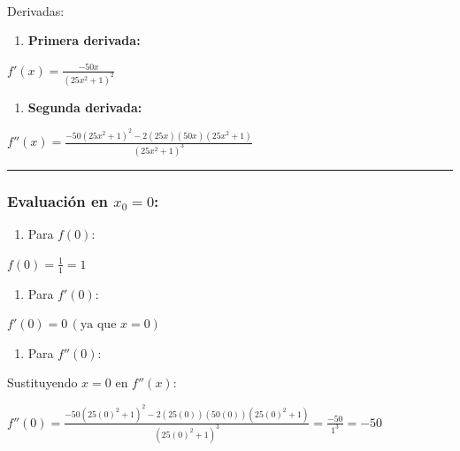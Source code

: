 \documentclass[
  letterpaper,
  DIV=11,
  numbers=noendperiod]{scrartcl}
\makeatletter
\let\oldparagraph\paragraph
\renewcommand{\paragraph}{
    \@ifstar
      \xxxParagraphStar
      \xxxParagraphNoStar
  }
\newcommand{\xxxParagraphStar}[1]{\oldparagraph*{#1}\mbox{}}
\newcommand{\xxxParagraphNoStar}[1]{\oldparagraph{#1}\mbox{}}
\providecommand{\tightlist}{%
  \setlength{\itemsep}{0pt}\setlength{\parskip}{0pt}}\usepackage{longtable,booktabs,array}
\makeatother
\begin{document}
\paragraph{Derivadas:}\label{derivadas}

\begin{enumerate}
\def\labelenumi{\arabic{enumi}.}
\tightlist
\item
  \textbf{Primera derivada:}
\end{enumerate}

\(f'(x) = \frac{-50x}{(25x^2 + 1)^2}\)

\begin{enumerate}
\def\labelenumi{\arabic{enumi}.}
\setcounter{enumi}{1}
\tightlist
\item
  \textbf{Segunda derivada:}
\end{enumerate}

\(f''(x) = \frac{-50(25x^2 + 1)^2 - 2(25x)(50x)(25x^2 + 1)}{(25x^2 + 1)^3}\)

\begin{center}\rule{0.5\linewidth}{0.5pt}\end{center}

\subsubsection{\texorpdfstring{Evaluación en
\(x_0 = 0\):}{Evaluación en x\_0 = 0:}}\label{evaluaciuxf3n-en-x_0-0}

\begin{enumerate}
\def\labelenumi{\arabic{enumi}.}
\tightlist
\item
  Para \(f(0)\):
\end{enumerate}

\(f(0) = \frac{1}{1} = 1\)

\begin{enumerate}
\def\labelenumi{\arabic{enumi}.}
\setcounter{enumi}{1}
\tightlist
\item
  Para \(f'(0)\):
\end{enumerate}

\(f'(0) = 0 \, (\text{ya que } x = 0)\)

\begin{enumerate}
\def\labelenumi{\arabic{enumi}.}
\setcounter{enumi}{2}
\tightlist
\item
  Para \(f''(0)\):
\end{enumerate}

Sustituyendo \(x = 0\) en \(f''(x)\):

\(f''(0) = \frac{-50(25(0)^2 + 1)^2 - 2(25(0))(50(0))(25(0)^2 + 1)}{(25(0)^2 + 1)^3} = \frac{-50}{1^3} = -50\)
\end{document}
